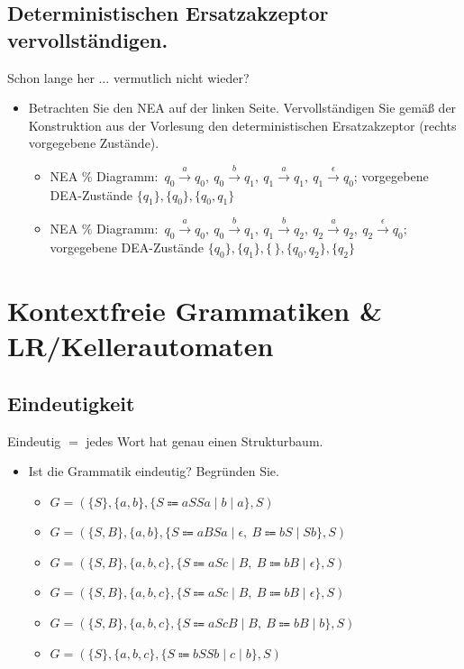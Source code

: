 \subsection{Deterministischen Ersatzakzeptor vervollständigen.}
Schon lange her $\ldots$ vermutlich nicht wieder?
\begin{itemize}
    \item Betrachten Sie den NEA auf der linken Seite.
    Vervollständigen Sie gemäß der Konstruktion aus
    der Vorlesung den deterministischen Ersatzakzeptor (rechts vorgegebene Zustände).
    \begin{itemize}
        \item NEA \% Diagramm:\ $q_0\xrightarrow{a}q_0,\ q_0\xrightarrow{b}q_1,\ q_1\xrightarrow{a}q_1,\ q_1\xrightarrow{\epsilon}q_0$;
        vorgegebene DEA-Zustände $\{q_1\},\{q_0\},\{q_0,q_1\}$  
        \item NEA \% Diagramm:\ $q_0\xrightarrow{a}q_0,\ q_0\xrightarrow{b}q_1,\ q_1\xrightarrow{b}q_2,\ q_2\xrightarrow{a}q_2,\ q_2\xrightarrow{\epsilon}q_0$;
        vorgegebene DEA-Zustände $\{q_0\},\{q_1\},\{\,\},\{q_0,q_2\},\{q_2\}$ 
    \end{itemize}
\end{itemize}

\section{Kontextfreie Grammatiken \& LR/Kellerautomaten}\label{subsec:kontextfreie-grammatiken-&-lr/kellerautomaten}

\subsection{Eindeutigkeit}
Eindeutig $=$ jedes Wort hat genau einen Strukturbaum.

\begin{itemize}
    \item Ist die Grammatik eindeutig?
    Begründen Sie.
    \begin{itemize}
        \item  $G=(\{S\},\{a,b\},\{S\Coloneqq aSSa\mid b\mid a\},S)$ 
        \item $G=(\{S,B\},\{a,b\},\{S\Coloneqq aBSa\mid\epsilon,\ B\Coloneqq bS\mid Sb\},S)$ 
        \item  $G=(\{S,B\},\{a,b,c\},\{S\Coloneqq aSc\mid B,\ B\Coloneqq bB\mid\epsilon\},S)$ 
        \item $G=(\{S,B\},\{a,b,c\},\{S\Coloneqq aSc\mid B,\ B\Coloneqq bB\mid\epsilon\},S)$ 
        \item  $G=(\{S,B\},\{a,b,c\},\{S\Coloneqq aScB\mid B,\ B\Coloneqq bB\mid b\},S)$ 
        \item $G=(\{S\},\{a,b,c\},\{S\Coloneqq bSSb\mid c\mid b\},S)$ 
    \end{itemize}
\end{itemize}

